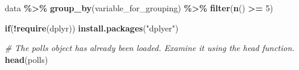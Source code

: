 \documentclass[
]{article}
\newenvironment{Shaded}{\begin{snugshade}}{\end{snugshade}}
\newcommand{\CommentTok}[1]{\textcolor[rgb]{0.56,0.35,0.01}{\textit{#1}}}
\newcommand{\ControlFlowTok}[1]{\textcolor[rgb]{0.13,0.29,0.53}{\textbf{#1}}}
\newcommand{\DecValTok}[1]{\textcolor[rgb]{0.00,0.00,0.81}{#1}}
\newcommand{\KeywordTok}[1]{\textcolor[rgb]{0.13,0.29,0.53}{\textbf{#1}}}
\newcommand{\NormalTok}[1]{#1}
\newcommand{\OperatorTok}[1]{\textcolor[rgb]{0.81,0.36,0.00}{\textbf{#1}}}
\newcommand{\StringTok}[1]{\textcolor[rgb]{0.31,0.60,0.02}{#1}}
\begin{document}
\begin{Shaded}
\begin{Highlighting}[]
\NormalTok{data }\OperatorTok{\%\textgreater{}\%}\StringTok{ }\KeywordTok{group\_by}\NormalTok{(variable\_for\_grouping) }
    \OperatorTok{\%\textgreater{}\%}\StringTok{ }\KeywordTok{filter}\NormalTok{(}\KeywordTok{n}\NormalTok{() }\OperatorTok{\textgreater{}=}\StringTok{ }\DecValTok{5}\NormalTok{)}
\end{Highlighting}
\end{Shaded}

\begin{Shaded}
\begin{Highlighting}[]
\ControlFlowTok{if}\NormalTok{(}\OperatorTok{!}\KeywordTok{require}\NormalTok{(dplyr)) }\KeywordTok{install.packages}\NormalTok{(}\StringTok{"dplyer"}\NormalTok{)}

\CommentTok{\# The \textasciigrave{}polls\textasciigrave{} object has already been loaded. Examine it using the \textasciigrave{}head\textasciigrave{} function.}
\KeywordTok{head}\NormalTok{(polls)}
\end{Highlighting}
\end{Shaded}
\end{document}
